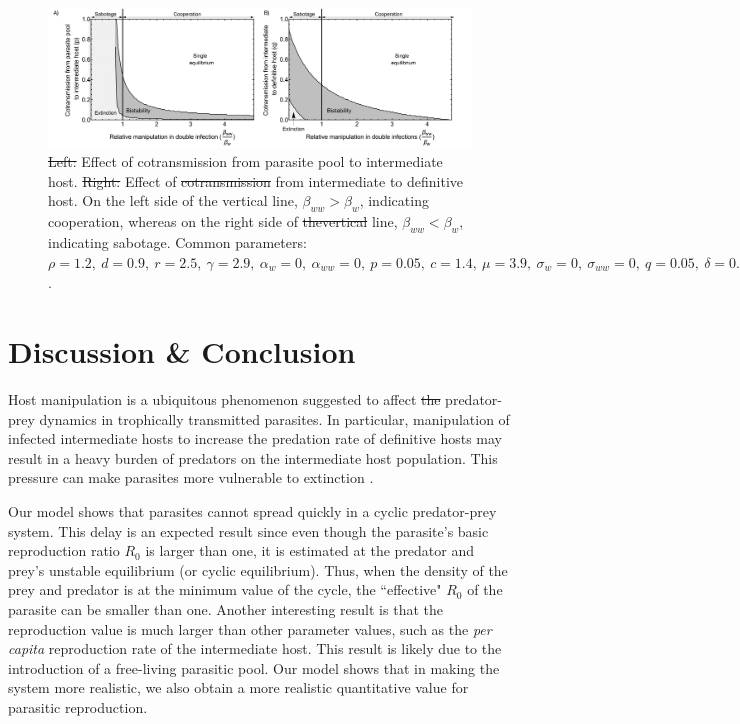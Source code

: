 \documentclass[a4paper]{scrartcl}
\providecommand{\DIFaddtex}[1]{{\protect\color{blue}\uwave{#1}}} %
\providecommand{\DIFdeltex}[1]{{\protect\color{red}\sout{#1}}}                      %
\providecommand{\DIFdelbegin}{} %
\providecommand{\DIFdelend}{} %
\providecommand{\DIFaddFL}[1]{\DIFadd{#1}} %
\providecommand{\DIFdelFL}[1]{\DIFdel{#1}} %
\providecommand{\DIFaddbeginFL}{} %
\providecommand{\DIFaddendFL}{} %
\providecommand{\DIFdelbeginFL}{} %
\providecommand{\DIFdelendFL}{} %
\providecommand{\DIFadd}[1]{\texorpdfstring{\DIFaddtex{#1}}{#1}} %
\providecommand{\DIFdel}[1]{\texorpdfstring{\DIFdeltex{#1}}{}} %
\newcommand{\DIFscaledelfig}{0.5}
\newlength{\DIFdelgraphicswidth} %
\newlength{\DIFdelgraphicsheight} %
\newcommand{\DIFaddincludegraphics}[2][]{{\color{blue}\fbox{\DIFOincludegraphics[#1]{#2}}}} %
\newcommand{\DIFdelincludegraphics}[2][]{%
\sbox{\DIFdelgraphicsbox}{\DIFOincludegraphics[#1]{#2}}%
\settoboxwidth{\DIFdelgraphicswidth}{\DIFdelgraphicsbox} %
\settoboxtotalheight{\DIFdelgraphicsheight}{\DIFdelgraphicsbox} %
\scalebox{\DIFscaledelfig}{%
\parbox[b]{\DIFdelgraphicswidth}{\usebox{\DIFdelgraphicsbox}\\[-\baselineskip] \rule{\DIFdelgraphicswidth}{0em}}\llap{\resizebox{\DIFdelgraphicswidth}{\DIFdelgraphicsheight}{%
\setlength{\unitlength}{\DIFdelgraphicswidth}%
\begin{picture}(1,1)%
\thicklines\linethickness{2pt} %
{\color[rgb]{1,0,0}\put(0,0){\framebox(1,1){}}}%
{\color[rgb]{1,0,0}\put(0,0){\line( 1,1){1}}}%
{\color[rgb]{1,0,0}\put(0,1){\line(1,-1){1}}}%
\end{picture}%
}\hspace*{3pt}}} %
} %
\DeclareRobustCommand{\DIFdelbegin}{\DIFOdelbegin \let\includegraphics\DIFdelincludegraphics} %
\DeclareRobustCommand{\DIFdelend}{\DIFOaddend \let\includegraphics\DIFOincludegraphics} %
\DeclareRobustCommand{\DIFaddbeginFL}{\DIFOaddbeginFL \let\includegraphics\DIFaddincludegraphics} %
\DeclareRobustCommand{\DIFaddendFL}{\DIFOaddendFL \let\includegraphics\DIFOincludegraphics} %
\DeclareRobustCommand{\DIFdelbeginFL}{\DIFOdelbeginFL \let\includegraphics\DIFdelincludegraphics} %
\DeclareRobustCommand{\DIFdelendFL}{\DIFOaddendFL \let\includegraphics\DIFOincludegraphics} %
\begin{document}
\begin{figure}[!ht]
	\captionsetup{format=plain}
	\centering
	\includegraphics[width=\textwidth]{Figures/coinfect_transmission.pdf}
	\caption{\DIFdelbeginFL \DIFdelFL{Left: }\DIFdelendFL \DIFaddbeginFL \DIFaddFL{A) }\DIFaddendFL Effect of cotransmission from parasite pool to intermediate host. \DIFdelbeginFL \DIFdelFL{Right: }\DIFdelendFL \DIFaddbeginFL \DIFaddFL{B)}\DIFaddendFL Effect of \DIFdelbeginFL \DIFdelFL{cotransmission }\DIFdelendFL \DIFaddbeginFL \DIFaddFL{co-transmission }\DIFaddendFL from intermediate to \DIFaddbeginFL \DIFaddFL{the }\DIFaddendFL definitive host. On the left side of the vertical line, $\beta_{ww} > \beta_{w}$, indicating cooperation, whereas on the right side of \DIFdelbeginFL \DIFdelFL{thevertical }\DIFdelendFL \DIFaddbeginFL \DIFaddFL{the vertical }\DIFaddendFL line, $\beta_{ww} < \beta_{w}$, indicating sabotage. Common parameters:  $\rho = 1.2, \ d = 0.9, \ r = 2.5, \ \gamma = 2.9, \ \alpha_w = 0, \ \alpha_{ww} = 0, \ p = 0.05, \ c = 1.4, \ \mu = 3.9, \ \sigma_w = 0, \ \sigma_{ww} = 0, \ q = 0.05, \ \delta = 0.9, \ k = 0.26, \ \epsilon = 4.5, \ \beta_w = 1.45, \ f_w = 38, \ h = 0.6$.}
	\label{fig:contransmission}
\end{figure}

\section*{Discussion \& Conclusion}
Host manipulation is a ubiquitous phenomenon suggested to affect \DIFdelbegin \DIFdel{the }\DIFdelend predator-prey dynamics in trophically transmitted parasites. 
In particular, manipulation of infected intermediate hosts to increase the predation rate of definitive hosts may result in a heavy burden of predators on the intermediate host population.
This pressure can make parasites more vulnerable to extinction \citep{Hadeler1989,Fenton2006}. 

Our model shows that parasites cannot spread quickly in a cyclic predator-prey system. 
This delay is an expected result since even though the parasite's basic reproduction ratio $R_0$ is larger than one, it is estimated at the predator and prey's unstable equilibrium (or cyclic equilibrium). 
Thus, when the density of the prey and predator is at the minimum value of the cycle, the ``effective" $R_0$ of the parasite can be smaller than one. 
Another interesting result is that the reproduction value is much larger than other parameter values, such as the \textit{per capita} reproduction rate of the intermediate host.
This result is likely due to the introduction of a free-living parasitic pool. Our model shows that in making the system more realistic, we also obtain a more realistic quantitative value for parasitic reproduction.
\end{document}
